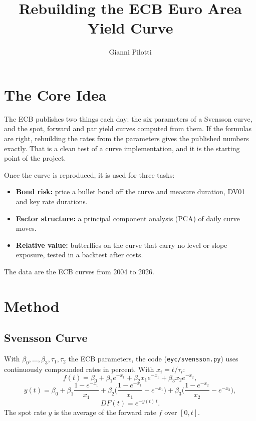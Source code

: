 \documentclass[11pt,a4paper]{article}
\title{Rebuilding the ECB Euro Area Yield Curve}
\author{Gianni Pilotti}
\date{}
\begin{document}
\maketitle

\section{The Core Idea}

The ECB publishes two things each day: the six parameters of a Svensson curve, and the spot, forward and par yield curves computed from them. If the formulas are right, rebuilding the rates from the parameters gives the published numbers exactly. That is a clean test of a curve implementation, and it is the starting point of the project.

Once the curve is reproduced, it is used for three tasks:

\begin{itemize}
\item \textbf{Bond risk:} price a bullet bond off the curve and measure duration, DV01 and key rate durations.
\item \textbf{Factor structure:} a principal component analysis (PCA) of daily curve moves.
\item \textbf{Relative value:} butterflies on the curve that carry no level or slope exposure, tested in a backtest after costs.
\end{itemize}

The data are the ECB curves from 2004 to 2026.

\section{Method}

\subsection{Svensson Curve}

With $\beta_0,\dots,\beta_3,\tau_1,\tau_2$ the ECB parameters, the code (\texttt{eyc/svensson.py}) uses continuously compounded rates in percent. With $x_i=t/\tau_i$:
\begin{equation}
f(t)=\beta_0+\beta_1e^{-x_1}+\beta_2x_1e^{-x_1}+\beta_3x_2e^{-x_2},
\end{equation}
\begin{equation}
y(t)=\beta_0+\beta_1\frac{1-e^{-x_1}}{x_1}+\beta_2\Big(\frac{1-e^{-x_1}}{x_1}-e^{-x_1}\Big)+\beta_3\Big(\frac{1-e^{-x_2}}{x_2}-e^{-x_2}\Big),
\end{equation}
\begin{equation}
DF(t)=e^{-y(t)\,t}.
\end{equation}
The spot rate $y$ is the average of the forward rate $f$ over $[0,t]$.
\end{document}
